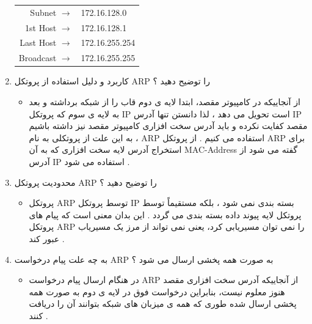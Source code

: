 \documentclass{article}
\begin{document}
\begin{enumerate}
\begin{tcolorbox}
\begin{latin}
\begin{center}
  \begin{tabular}{ r  l   }
    Subnet $\to$ & 172.16.128.0  \\
    1st Host $\to$ & 172.16.128.1  \\
    Last Host $\to$ & 172.16.255.254 \\
    Broadcast $\to$ & 172.16.255.255 \\
  \end{tabular}
\end{center}
\end{latin}

\end{tcolorbox}

\item کاربرد و دلیل استفاده از پروتکل ARP را توضیح دهید ؟

\begin{tcolorbox}
\begin{itemize}
	\item از آنجاییکه در کامپیوتر مقصد، ابتدا لایه ی دوم قاب را از شبکه برداشته و بعد به لایه ی سوم که پروتکل IP 
	است تحویل می دهد ، لذا دانستن تنها آدرس IP مقصد کفایت نکرده و باید آدرس سخت افزاری کامپیوتر مقصد نیز داشته باشیم ، به این علت از پروتکلی به نام ARP استفاده می کنیم . 
	از پروتکل ARP 
	برای استخراج آدرس لایه سخت افزاری که به آن
	MAC-Address
	گفته می شود از آدرس IP استفاده می شود .
\end{itemize}
\end{tcolorbox}

\item محدودیت پروتکل ARP را توضیح دهید ؟

\begin{tcolorbox}
\begin{itemize}
	\item پروتکل ARP
	توسط پروتکل IP بسته بندی نمی شود ، بلکه مستقیماً توسط پروتکل لایه پیوند داده بسته بندی می گردد . این بدان معنی است که پیام های پروتکل ARP را نمی توان مسیریابی کرد، یعنی نمی تواند از مرز یک مسیریاب عبور کند .
\end{itemize}
\end{tcolorbox}



\newpage

\item به چه علت پیام درخواست ARP به صورت همه پخشی ارسال می شود ؟

\begin{tcolorbox}
\begin{itemize}
	\item در هنگام ارسال پیام درخواست ARP
	از آنجاییکه آدرس سخت افزاری مقصد هنوز معلوم نیست، بنابراین درخواست فوق در لایه ی دوم به صورت همه پخشی ارسال شده طوری که همه ی میزبان های شبکه بتوانند آن را دریافت کنند .
\end{itemize}
\end{tcolorbox}


\end{enumerate}
\end{document}

